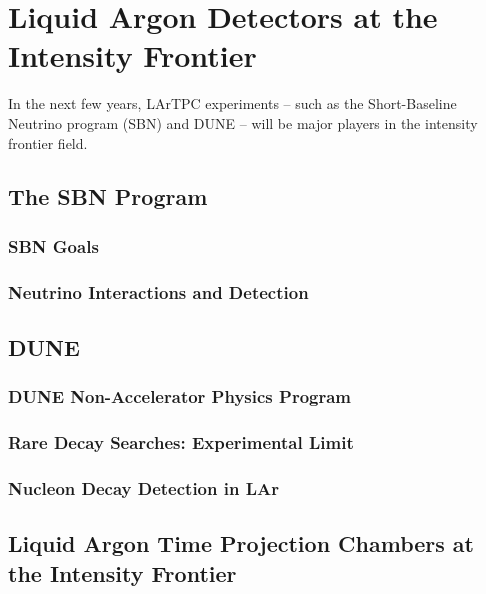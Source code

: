\chapter{Liquid Argon Detectors at the Intensity Frontier}\label{ch:1}


In the next few years, LArTPC experiments -- such as the Short-Baseline Neutrino program (SBN) and DUNE -- will be major players in the intensity frontier field. 

\section{The SBN Program}
\subsection{SBN Goals}
\subsection{Neutrino Interactions and Detection }

\section{DUNE}
\subsection{DUNE Non-Accelerator Physics Program}
\subsection{Rare Decay Searches: Experimental Limit}
\subsection{Nucleon Decay Detection in LAr}

\section{Liquid Argon Time Projection Chambers at the Intensity Frontier}



